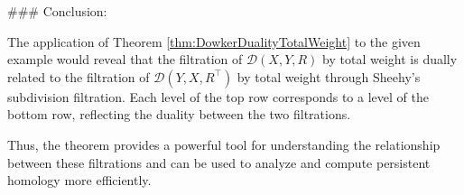 ### Conclusion:

The application of Theorem \ref{thm:DowkerDualityTotalWeight} to the given example would reveal that the filtration of \(\mathcal{D}(X, Y, R)\) by total weight is dually related to the filtration of \(\mathcal{D}(Y, X, R^\top)\) by total weight through Sheehy's subdivision filtration. Each level of the top row corresponds to a level of the bottom row, reflecting the duality between the two filtrations.

Thus, the theorem provides a powerful tool for understanding the relationship between these filtrations and can be used to analyze and compute persistent homology more efficiently.